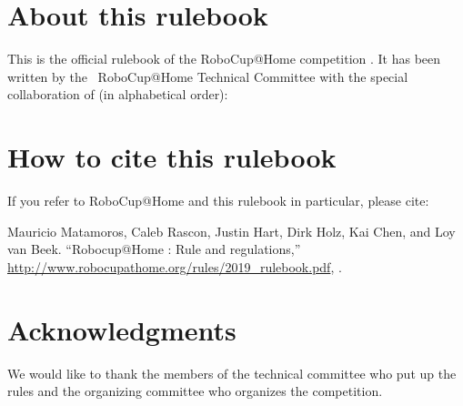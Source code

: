 


\section*{About this rulebook}
This is the official rulebook of the RoboCup@Home competition \YEAR.
It has been written by the \YEAR ~RoboCup@Home Technical Committee with the special collaboration of (in alphabetical order):



\section*{How to cite this rulebook}
If you refer to RoboCup@Home and this rulebook in particular, please cite:

Mauricio Matamoros, Caleb Rascon, Justin Hart, Dirk Holz, Kai Chen, and Loy van Beek.
\enquote{Robocup@Home \YEAR: Rule and regulations,}
\url{http://www.robocupathome.org/rules/2019_rulebook.pdf}, \YEAR.

\begin{center}
\begin{minipage}{0.8\textwidth}
	\footnotesize%
	
\end{minipage}
\end{center}

\section*{Acknowledgments}
\label{sec:acknowledgments}
We would like to thank the members of the technical committee who put up the rules and the organizing committee who organizes the competition.

